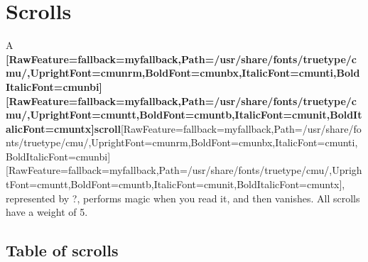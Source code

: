 \chapter{Scrolls}
A {\bfseries \allowbreak{}\setmainfont{cmunbx.ttf}[RawFeature={fallback=myfallback},Path=/usr/share/fonts/truetype/cmu/,UprightFont=cmunrm,BoldFont=cmunbx,ItalicFont=cmunti,BoldItalicFont=cmunbi]\setmonofont{cmunbx.ttf}[RawFeature={fallback=myfallback},Path=/usr/share/fonts/truetype/cmu/,UprightFont=cmuntt,BoldFont=cmuntb,ItalicFont=cmunit,BoldItalicFont=cmuntx]\bfseries scroll}\allowbreak{}\setmainfont{cmunrm.ttf}[RawFeature={fallback=myfallback},Path=/usr/share/fonts/truetype/cmu/,UprightFont=cmunrm,BoldFont=cmunbx,ItalicFont=cmunti,BoldItalicFont=cmunbi]\setmonofont{cmunrm.ttf}[RawFeature={fallback=myfallback},Path=/usr/share/fonts/truetype/cmu/,UprightFont=cmuntt,BoldFont=cmuntb,ItalicFont=cmunit,BoldItalicFont=cmuntx], represented by ?, performs magic\footnotemark[18] when you read it, and then vanishes. All scrolls have a weight of 5.

\section{Table of scrolls}
\label{1}

